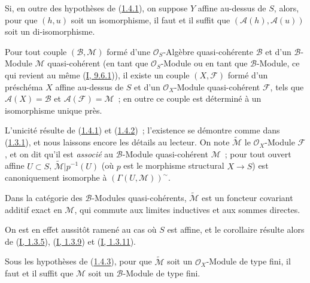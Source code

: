\begin{corollary}[1.4.2]
\label{II.1.4.2-fr}
Si, en outre des hypothèses de (\hyperref[II.1.4.1-fr]{1.4.1}), on suppose
$Y$ affine au-dessus de $S$, alors, pour que $(h,u)$ soit un isomorphisme,
il faut et il suffit que $(\mathcal{A}(h),\mathcal{A}(u))$ soit un
di-isomorphisme.
\end{corollary}

\begin{proposition}[1.4.3]
\label{II.1.4.3-fr}
Pour tout couple $(\mathcal{B},\mathcal{M})$ formé d'une
$\mathcal{O}_S$-Algèbre quasi-cohérente $\mathcal{B}$ et d'un
$\mathcal{B}$-Module $\mathcal{M}$ quasi-cohérent (en tant que
$\mathcal{O}_S$-Module ou en tant que $\mathcal{B}$-Module, ce qui revient au
même (\hyperref[I.9.6.1-fr]{I, 9.6.1})), il existe un couple
$(X,\mathcal{F})$ formé d'un préschéma $X$ affine au-dessus de $S$ et d'un
$\mathcal{O}_X$-Module quasi-cohérent $\mathcal{F}$, tels que
$\mathcal{A}(X)=\mathcal{B}$ et $\mathcal{A}(\mathcal{F})=\mathcal{M}$~; en
outre ce couple est déterminé à un isomorphisme unique près.
\end{proposition}

L'unicité résulte de (\hyperref[II.1.4.1-fr]{1.4.1}) et
(\hyperref[II.1.4.2-fr]{1.4.2})~; l'existence se démontre comme dans
(\hyperref[II.1.3.1-fr]{1.3.1}), et nous laissons encore les détails au
lecteur. On note $\widetilde{\mathcal{M}}$ le $\mathcal{O}_X$-Module
$\mathcal{F}$, et on dit qu'il est \emph{associé} au $\mathcal{B}$-Module
quasi-cohérent $\mathcal{M}$~; pour tout ouvert affine $U\subset S$,
$\widetilde{\mathcal{M}}|p^{-1}(U)$ (où $p$ est le morphisme structural
$X\to S$) est canoniquement isomorphe à
$(\Gamma(U,\mathcal{M}))^{\sim}$.

\begin{corollary}[1.4.4]
\label{II.1.4.4-fr}
Dans la catégorie des $\mathcal{B}$-Modules quasi-cohérents,
$\widetilde{\mathcal{M}}$ est un foncteur covariant additif exact en
$\mathcal{M}$, qui commute aux limites inductives et aux sommes directes.
\end{corollary}

On est en effet aussitôt ramené au cas où $S$ est affine, et le corollaire
résulte alors de (\hyperref[I.1.3.5-fr]{I, 1.3.5}),
(\hyperref[I.1.3.9-fr]{I, 1.3.9}) et
(\hyperref[I.1.3.11-fr]{I, 1.3.11}).

\begin{corollary}[1.4.5]
\label{II.1.4.5-fr}
Sous les hypothèses de (\hyperref[II.1.4.3-fr]{1.4.3}), pour que
$\widetilde{\mathcal{M}}$ soit un $\mathcal{O}_X$-Module de type fini, il faut
et il suffit que $\mathcal{M}$ soit un $\mathcal{B}$-Module de type fini.
\end{corollary}

